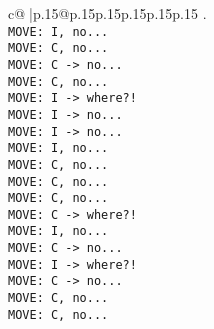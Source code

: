 \documentclass{article}
\begin{document}
{\begin{supertabular}{c@{$\;$}|p{.15\linewidth}@{}p{.15\linewidth}p{.15\linewidth}p{.15\linewidth}p{.15\linewidth}p{.15\linewidth}}
{{{.\\ \tt  MOVE: I, no...\\ \tt  MOVE: C, no...\\ \tt  MOVE: C -> no...\\ \tt  MOVE: C, no...\\ \tt  MOVE: I -> where?!\\ \tt  MOVE: I -> no...\\ \tt  MOVE: I -> no...\\ \tt  MOVE: I, no...\\ \tt  MOVE: C, no...\\ \tt  MOVE: C, no...\\ \tt  MOVE: C, no...\\ \tt  MOVE: C -> where?!\\ \tt  MOVE: I, no...\\ \tt  MOVE: C -> no...\\ \tt  MOVE: I -> where?!\\ \tt  MOVE: C -> no...\\ \tt  MOVE: C, no...\\ \tt  MOVE: C, no...\\}}}
\end{supertabular}}
\end{document}
